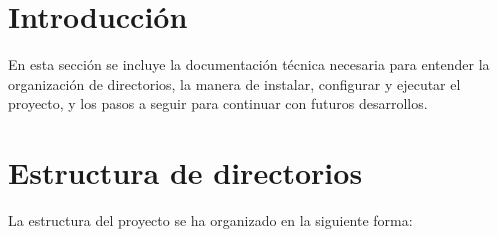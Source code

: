 
\section{Introducción}

En esta sección se incluye la documentación técnica necesaria para entender la organización de directorios, la manera de instalar, configurar y ejecutar el proyecto, y los pasos a seguir para continuar con futuros desarrollos.


\section{Estructura de directorios}

La estructura del proyecto se ha organizado en la siguiente forma:

